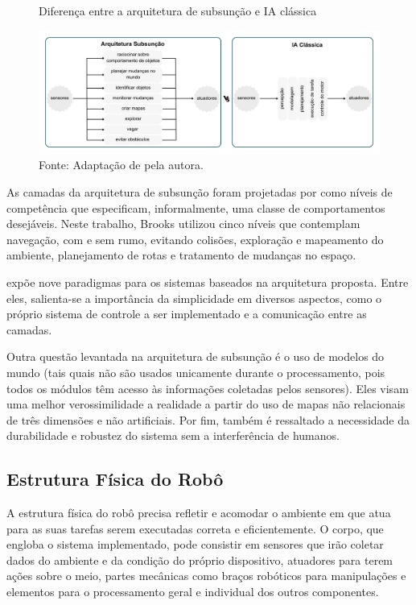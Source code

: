 \begin{figure}[h]
    \centering
    \caption{Diferença entre a arquitetura de subsunção e IA clássica}
    \includegraphics[scale=0.2]{abordagens.png}
    \caption*{Fonte: Adaptação de \citet{brooks85} pela autora.}
    \label{fig:abordagens}
\end{figure}

As camadas da arquitetura de subsunção foram projetadas por \citet{brooks85} como níveis de competência que especificam, informalmente, uma classe de comportamentos desejáveis. Neste trabalho, Brooks utilizou cinco níveis que contemplam navegação, com e sem rumo, evitando colisões, exploração e mapeamento do ambiente,  planejamento de rotas e tratamento de mudanças no espaço. 

\citet{brooks85} expõe nove paradigmas para os sistemas baseados na arquitetura proposta. Entre eles, salienta-se a importância da simplicidade em diversos aspectos, como o próprio sistema de controle a ser implementado e a comunicação entre as camadas. 

Outra questão levantada na arquitetura de subsunção é o uso de modelos do mundo (tais quais não são usados unicamente durante o processamento, pois todos os módulos têm acesso às informações coletadas pelos sensores). Eles visam uma melhor verossimilidade a realidade a partir do uso de mapas não relacionais de três dimensões e não artificiais. Por fim, também é ressaltado a necessidade da durabilidade e robustez do sistema sem a interferência de humanos.


\subsection{Estrutura Física do Robô} %

A estrutura física do robô precisa refletir e acomodar o ambiente em que atua para as suas tarefas serem executadas correta e eficientemente. O corpo, que engloba o sistema implementado, pode consistir em sensores que irão coletar dados do ambiente e da condição do próprio dispositivo, atuadores para terem ações sobre o meio, partes mecânicas como braços robóticos para manipulações e elementos para o processamento geral e individual dos outros componentes.


